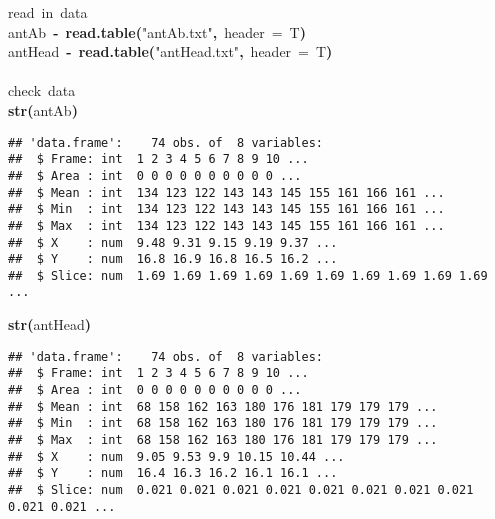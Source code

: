 \documentclass{article}\usepackage{graphicx, color}
\makeatletter
\newcommand{\hlfunctioncall}[1]{\textcolor[rgb]{0.501960784313725,0,0.329411764705882}{\textbf{#1}}}%
\newcommand{\hlstring}[1]{\textcolor[rgb]{0.6,0.6,1}{#1}}%
\newcommand{\hlkeyword}[1]{\textcolor[rgb]{0,0,0}{\textbf{#1}}}%
\newcommand{\hlargument}[1]{\textcolor[rgb]{0.690196078431373,0.250980392156863,0.0196078431372549}{#1}}%
\newcommand{\hlcomment}[1]{\textcolor[rgb]{0.180392156862745,0.6,0.341176470588235}{#1}}%
\newcommand{\hlassignement}[1]{\textcolor[rgb]{0,0,0}{\textbf{#1}}}%
\newcommand{\hlsymbol}[1]{\textcolor[rgb]{0,0,0}{#1}}%
\newcommand{\hlstd}[1]{\textcolor[rgb]{0,0,0}{#1}}%
\newenvironment{kframe}{%
 \def\FrameCommand##1{\hskip\@totalleftmargin \hskip-\fboxsep
 \colorbox{shadecolor}{##1}\hskip-\fboxsep
     \hskip-\linewidth \hskip-\@totalleftmargin \hskip\columnwidth}%
 \MakeFramed {\advance\hsize-\width
   \@totalleftmargin\z@ \linewidth\hsize
   \@setminipage}}%
 {\par\unskip\endMakeFramed}
\newenvironment{knitrout}{}{} %
\makeatother
\begin{document}
\begin{knitrout}
\color{fgcolor}\begin{kframe}
\begin{flushleft}
\ttfamily\noindent
\hlcomment{\usebox{\hlnormalsizeboxhash}{\ }read{\ }in{\ }data}\hspace*{\fill}\\
\hlstd{}\hlsymbol{antAb}{\ }\hlassignement{\usebox{\hlnormalsizeboxlessthan}-}{\ }\hlfunctioncall{read.table}\hlkeyword{(}\hlstring{"{}{}antAb.txt"{}{}}\hlkeyword{,}{\ }\hlargument{header}{\ }\hlargument{=}{\ }\hlsymbol{T}\hlkeyword{)}\hspace*{\fill}\\
\hlstd{}\hlsymbol{antHead}{\ }\hlassignement{\usebox{\hlnormalsizeboxlessthan}-}{\ }\hlfunctioncall{read.table}\hlkeyword{(}\hlstring{"{}{}antHead.txt"{}{}}\hlkeyword{,}{\ }\hlargument{header}{\ }\hlargument{=}{\ }\hlsymbol{T}\hlkeyword{)}\hspace*{\fill}\\
\hlstd{}\hspace*{\fill}\\
\hlstd{}\hlcomment{\usebox{\hlnormalsizeboxhash}{\ }check{\ }data}\hspace*{\fill}\\
\hlstd{}\hlfunctioncall{str}\hlkeyword{(}\hlsymbol{antAb}\hlkeyword{)}\mbox{}
\normalfont
\end{flushleft}
\begin{verbatim}
## 'data.frame':	74 obs. of  8 variables:
##  $ Frame: int  1 2 3 4 5 6 7 8 9 10 ...
##  $ Area : int  0 0 0 0 0 0 0 0 0 0 ...
##  $ Mean : int  134 123 122 143 143 145 155 161 166 161 ...
##  $ Min  : int  134 123 122 143 143 145 155 161 166 161 ...
##  $ Max  : int  134 123 122 143 143 145 155 161 166 161 ...
##  $ X    : num  9.48 9.31 9.15 9.19 9.37 ...
##  $ Y    : num  16.8 16.9 16.8 16.5 16.2 ...
##  $ Slice: num  1.69 1.69 1.69 1.69 1.69 1.69 1.69 1.69 1.69 1.69 ...
\end{verbatim}
\begin{flushleft}
\ttfamily\noindent
\hlfunctioncall{str}\hlkeyword{(}\hlsymbol{antHead}\hlkeyword{)}\mbox{}
\normalfont
\end{flushleft}
\begin{verbatim}
## 'data.frame':	74 obs. of  8 variables:
##  $ Frame: int  1 2 3 4 5 6 7 8 9 10 ...
##  $ Area : int  0 0 0 0 0 0 0 0 0 0 ...
##  $ Mean : int  68 158 162 163 180 176 181 179 179 179 ...
##  $ Min  : int  68 158 162 163 180 176 181 179 179 179 ...
##  $ Max  : int  68 158 162 163 180 176 181 179 179 179 ...
##  $ X    : num  9.05 9.53 9.9 10.15 10.44 ...
##  $ Y    : num  16.4 16.3 16.2 16.1 16.1 ...
##  $ Slice: num  0.021 0.021 0.021 0.021 0.021 0.021 0.021 0.021 0.021 0.021 ...
\end{verbatim}
\end{kframe}
\end{knitrout}
\end{document}
